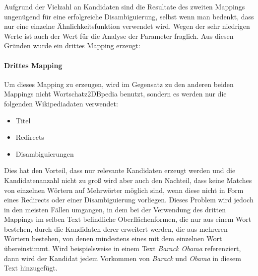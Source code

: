 Aufgrund der Vielzahl an Kandidaten sind die Resultate des zweiten Mappings ungenügend für eine erfolgreiche Disambiguierung, selbst wenn man bedenkt, dass nur eine einzelne Ähnlichkeitsfunktion verwendet wird.
Wegen der sehr niedrigen Werte ist auch der Wert für die Analyse der Parameter fraglich.
Aus diesen Gründen wurde ein drittes Mapping erzeugt:

\FloatBarrier
\paragraph{Drittes Mapping}

Um dieses Mapping zu erzeugen, wird im Gegensatz zu den anderen beiden Mappings nicht Wortschatz2DBpedia benutzt, sondern es werden nur die folgenden Wikipediadaten verwendet:
\begin{itemize}
\item Titel
\item Redirects
\item Disambiguierungen
\end{itemize}

Dies hat den Vorteil, dass nur relevante Kandidaten erzeugt werden und die Kandidatenanzahl nicht zu groß wird aber auch den Nachteil, dass keine Matches von einzelnen Wörtern auf Mehrwörter möglich sind, wenn diese nicht in Form eines Redirects oder einer Disambiguierung vorliegen.
Dieses Problem wird jedoch in den meisten Fällen umgangen, in dem bei der Verwendung des dritten Mappings im selben Text befindliche Oberflächenformen, die nur aus einem Wort bestehen, durch die Kandidaten derer erweitert werden,
die aus mehreren Wörtern bestehen, von denen mindestens eines mit dem einzelnen Wort übereinstimmt. Wird beispielsweise in einem Text \emph{Barack Obama} referenziert, dann wird der Kandidat  jedem
Vorkommen von \emph{Barack} und \emph{Obama} in diesem Text hinzugefügt.

